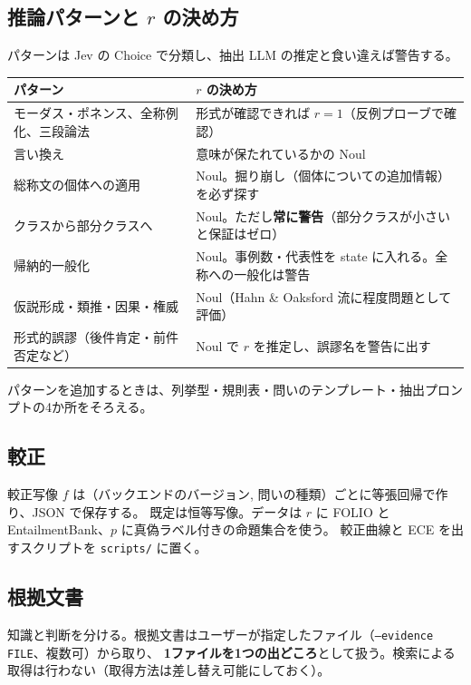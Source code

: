 \documentclass[a4paper,11pt]{ltjsarticle}
\begin{document}
\subsection{推論パターンと $r$ の決め方}\label{sec:pattern}

パターンは Jev の Choice で分類し、抽出 LLM の推定と食い違えば警告する。
\begin{table}[htbp]
\centering\small
\begin{tabularx}{\linewidth}{lX}
\toprule
パターン & $r$ の決め方 \\
\midrule
モーダス・ポネンス、全称例化、三段論法 & 形式が確認できれば $r=1$（反例プローブで確認）\\
言い換え & 意味が保たれているかの Noul \\
総称文の個体への適用 & Noul。掘り崩し（個体についての追加情報）を必ず探す \\
クラスから部分クラスへ & Noul。ただし\textbf{常に警告}（部分クラスが小さいと保証はゼロ）\\
帰納的一般化 & Noul。事例数・代表性を state に入れる。全称への一般化は警告 \\
仮説形成・類推・因果・権威 & Noul（Hahn \& Oaksford 流に程度問題として評価）\\
形式的誤謬（後件肯定・前件否定など） & Noul で $r$ を推定し、誤謬名を警告に出す \\
\bottomrule
\end{tabularx}
\end{table}
パターンを追加するときは、列挙型・規則表・問いのテンプレート・抽出プロンプトの4か所をそろえる。

\subsection{較正}

較正写像 $f$ は（バックエンドのバージョン, 問いの種類）ごとに等張回帰で作り、JSON で保存する。
既定は恒等写像。データは $r$ に FOLIO と EntailmentBank、$p$ に真偽ラベル付きの命題集合を使う。
較正曲線と ECE を出すスクリプトを \texttt{scripts/} に置く。

\subsection{根拠文書}\label{sec:evidence}

知識と判断を分ける。根拠文書はユーザーが指定したファイル（\texttt{--evidence FILE}、複数可）から取り、
\textbf{1ファイルを1つの出どころ}として扱う。検索による取得は行わない（取得方法は差し替え可能にしておく）。
\end{document}
